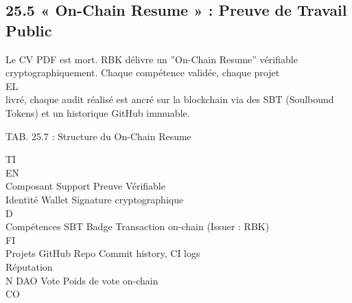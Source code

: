 \documentclass[12pt,landscape,a4paper]{article}
\begin{document}
\subsection{25.5 « On-Chain Resume » : Preuve de Travail Public}
Le CV PDF est mort. RBK délivre un ”On-Chain Resume” vérifiable cryptographiquement. Chaque compétence validée, chaque projet\\
\vspace{0.5em}
\vspace{0.5em}
\vspace{0.5em}
\vspace{0.5em}
EL\\
livré, chaque audit réalisé est ancré sur la blockchain via des SBT (Soulbound Tokens) et un historique GitHub immuable.\\
\vspace{0.5em}
\begin{center}\begin{tabular}TAB. 25.7 : Structure du On-Chain Resume\end{tabular}\end{center}
\vspace{0.5em}
\vspace{0.5em}
\vspace{0.5em}
\vspace{0.5em}
TI\\
EN\\
Composant Support       Preuve Vérifiable\\
Identité    Wallet      Signature cryptographique\\
\vspace{0.5em}
\vspace{0.5em}
\vspace{0.5em}
\vspace{0.5em}
D\\
Compétences SBT Badge   Transaction on-chain (Issuer : RBK)\\
\vspace{0.5em}
\vspace{0.5em}
\vspace{0.5em}
\vspace{0.5em}
FI\\
Projets     GitHub Repo Commit history, CI logs\\
Réputation\\
N DAO Vote    Poids de vote on-chain\\
CO\\
\vspace{0.5em}
\end{document}
